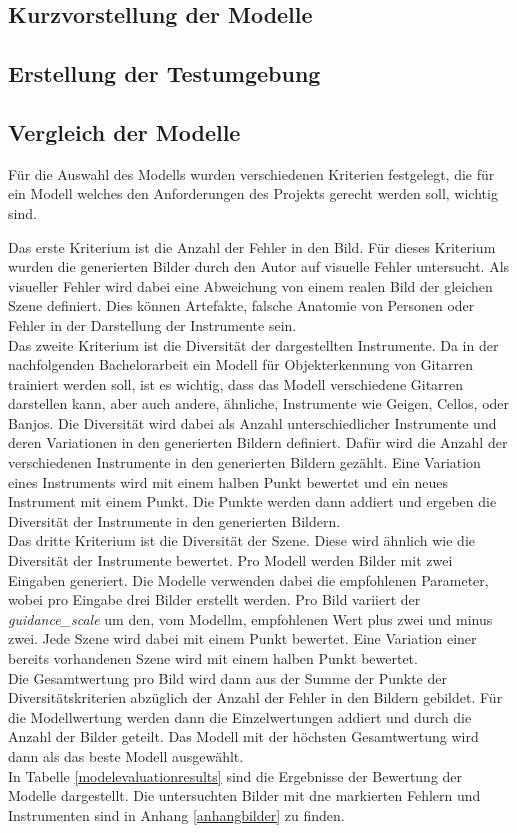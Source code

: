 \subsection{Kurzvorstellung der Modelle}

\subsection{Erstellung der Testumgebung}
\subsection{Vergleich der Modelle}
Für die Auswahl des Modells wurden verschiedenen Kriterien festgelegt, die für ein Modell welches den Anforderungen des Projekts gerecht werden soll, wichtig sind.

Das erste Kriterium ist die Anzahl der Fehler in den Bild. Für dieses Kriterium wurden die generierten Bilder durch den Autor auf visuelle Fehler untersucht. Als visueller Fehler wird dabei eine Abweichung von einem realen Bild der gleichen Szene definiert. Dies können Artefakte, falsche Anatomie von Personen oder Fehler in der Darstellung der Instrumente sein.\\
Das zweite Kriterium ist die Diversität der dargestellten Instrumente. Da in der nachfolgenden Bachelorarbeit ein Modell für Objekterkennung von Gitarren trainiert werden soll, ist es wichtig, dass das Modell verschiedene Gitarren darstellen kann, aber auch andere, ähnliche, Instrumente wie Geigen, Cellos, oder Banjos. Die Diversität wird dabei als Anzahl unterschiedlicher Instrumente und deren Variationen in den generierten Bildern definiert. Dafür wird die Anzahl der verschiedenen Instrumente in den generierten Bildern gezählt. Eine Variation eines Instruments wird mit einem halben Punkt bewertet und ein neues Instrument mit einem Punkt. Die Punkte werden dann addiert und ergeben die Diversität der Instrumente in den generierten Bildern.\\
Das dritte Kriterium ist die Diversität der Szene. Diese wird ähnlich wie die Diversität der Instrumente bewertet. Pro Modell werden Bilder mit zwei Eingaben generiert. Die Modelle verwenden dabei die empfohlenen Parameter, wobei pro Eingabe drei Bilder erstellt werden. Pro Bild variiert der \emph{guidance\_scale} um den, vom Modellm, empfohlenen Wert plus zwei und minus zwei. Jede Szene wird dabei mit einem Punkt bewertet. Eine Variation einer bereits vorhandenen Szene wird mit einem halben Punkt bewertet.\\
Die Gesamtwertung pro Bild wird dann aus der Summe der Punkte der Diversitätskriterien abzüglich der Anzahl der Fehler in den Bildern gebildet. Für die Modellwertung werden dann die Einzelwertungen addiert und durch die Anzahl der Bilder geteilt. Das Modell mit der höchsten Gesamtwertung wird dann als das beste Modell ausgewählt.\\
In Tabelle \ref{modelevaluationresults} sind die Ergebnisse der Bewertung der Modelle dargestellt. Die untersuchten Bilder mit dne markierten Fehlern und Instrumenten sind in Anhang \ref{anhangbilder} zu finden.

